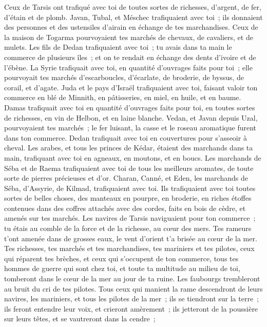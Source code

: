 \begin{multicols}{2}
Ceux de Tarsis ont trafiqué avec toi de toutes sortes de richesses, d'argent, de fer, d'étain et de plomb.
Javan, Tubal, et Méschec trafiquaient avec toi~; ils donnaient des personnes et des ustensiles d'airain en échange de tes marchandises.
Ceux de la maison de Togarma pourvoyaient tes marchés de chevaux, de cavaliers, et de mulets.
Les fils de Dedan trafiquaient avec toi~; tu avais dans ta main le commerce de plusieurs îles~; et on te rendait en échange des dents d'ivoire et de l'ébène.
La Syrie trafiquait avec toi, en quantité d'ouvrages faits pour toi~; elle pourvoyait tes marchés d'escarboucles, d'écarlate, de broderie, de byssus, de corail, et d'agate.
Juda et le pays d'Israël trafiquaient avec toi, faisant valoir ton commerce en blé de Minnith, en pâtisseries, en miel, en huile, et en baume.
Damas trafiquait avec toi en quantité d'ouvrages faits pour toi, en toutes sortes de richesses, en vin de Helbon, et en laine blanche.
Vedan, et Javan depuis Uzal, pourvoyaient tes marchés~; le fer luisant, la casse et le roseau aromatique furent dans ton commerce.
Dedan trafiquait avec toi en couvertures pour s'asseoir à cheval.
Les arabes, et tous les princes de Kédar, étaient des marchands dans ta main, trafiquant avec toi en agneaux, en moutons, et en boucs.
Les marchands de Séba et de Raema trafiquaient avec toi de tous les meilleurs aromates, de toute sorte de pierres précieuses et d'or.
Charan, Canné, et Eden, les marchands de Séba, d'Assyrie, de Kilmad, trafiquaient avec toi.
Ils trafiquaient avec toi toutes sortes de belles choses, des manteaux en pourpre, en broderie, en riches étoffes contenues dans des coffres attachés avec des cordes, faits en bois de cèdre, et amenés sur tes marchés.
Les navires de Tarsis naviguaient pour ton commerce~; tu étais au comble de la force et de la richesse, au cœur des mers.
Tes rameurs t'ont amenée dans de grosses eaux, le vent d'orient t'a brisée au cœur de la mer.
Tes richesses, tes marchés et tes marchandises, tes mariniers et tes pilotes, ceux qui réparent tes brèches, et ceux qui s'occupent de ton commerce, tous tes hommes de guerre qui sont chez toi, et toute ta multitude au milieu de toi, tomberont dans le cœur de la mer au jour de ta ruine.
Les faubourgs trembleront au bruit du cri de tes pilotes.
Tous ceux qui manient la rame descendront de leurs navires, les mariniers, et tous les pilotes de la mer~; ils se tiendront sur la terre~;
ils feront entendre leur voix, et crieront amèrement~; ils jetteront de la poussière sur leurs têtes, et se vautreront dans la cendre~;

\end{multicols}
